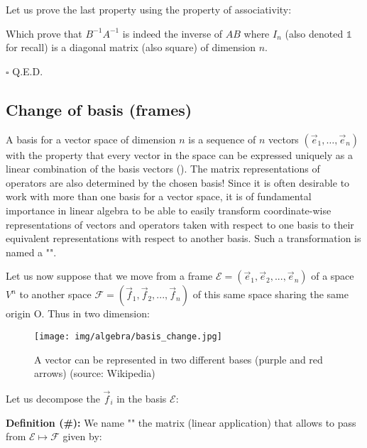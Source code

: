 	Let us prove the last property using the property of associativity:
	\begin{dem}
	
	Which prove that $B^{-1}A^{-1}$ is indeed the inverse of $AB$ where $I_n$ (also denoted $\mathds{1}$ for recall) is a diagonal matrix (also square) of dimension $n$.
	\begin{flushright}
		$\square$  Q.E.D.
	\end{flushright}
	\end{dem}
	
	\pagebreak
	\subsection{Change of basis (frames)}\label{change of basis}
	A basis for a vector space of dimension $n$ is a sequence of $n$ vectors $(\vec{e}_1, …, \vec{e}_n)$ with the property that every vector in the space can be expressed uniquely as a linear combination of the basis vectors (). The matrix representations of operators are also determined by the chosen basis! Since it is often desirable to work with more than one basis for a vector space, it is of fundamental importance in linear algebra to be able to easily transform coordinate-wise representations of vectors and operators taken with respect to one basis to their equivalent representations with respect to another basis. Such a transformation is named a "".
	
	Let us now suppose that we move from a frame $\mathcal{E}=(\vec{e}_1,\vec{e}_2,...,\vec{e}_n)$ of a space $V^n$ to another space $\mathcal{F}=(\vec{f}_1,\vec{f}_2,...,\vec{f}_n)$ of this same space sharing the same origin O. Thus in two dimension:
	\begin{figure}[H]
		\centering
		\texttt{[image: img/algebra/basis\_change.jpg]}
		\caption[A vector can be represented in two different bases (purple and red arrows]{A vector can be represented in two different bases (purple and red arrows) (source: Wikipedia)}
	\end{figure}
	Let us decompose the $\vec{f}_i$ in the basis $\mathcal{E}$:
	
	\textbf{Definition (\#\mydef):} We name "" the matrix (linear application) that allows to pass from $\mathcal{E}\mapsto \mathcal{F}$ given by:
	
